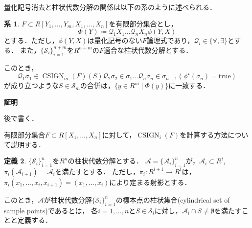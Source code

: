 \documentclass[uplatex, dvipdfmx]{jsarticle}
\makeatletter
\numberwithin{equation}{section}
\renewenvironment{proof}[1][\proofname]{\par
  \pushQED{\qed}%
  \normalfont \topsep6\p@\@plus6\p@\relax
  \trivlist
  \item\relax
  {\bfseries
  #1\@addpunct{.}}\hspace\labelsep\ignorespaces
}{
  \popQED\endtrivlist\@endpefalse
}
\newcommand{\Qua}{\mathcal{Q}}
\newcommand{\map}[3]{{#1}\colon{#2}\rightarrow{#3}}
\newcommand{\true}{\text{true}}
\DeclareMathOperator{\CSIGN}{CSIGN}
\theoremstyle{definition}
\newtheorem{definition}{定義}[section]
\newtheorem{corollary}[definition]{系}
\renewcommand{\proofname}{\textbf{証明}}
\makeatother
\begin{document}
量化記号消去と柱状代数分解の関係は以下の系のように述べられる．
\begin{corollary}
     $F \subset R[Y_1, \dots, Y_m, X_1, \dots, X_n]$を有限部分集合とし，
     \begin{equation}
          \Phi(Y)\coloneqq \Qua_1 X_1 \dots \Qua_n X_n \phi(Y,X)
     \end{equation}
     とする．ただし，$\phi(Y,X)$は量化記号のない$F$論理式であり，$\Qua_i \in \{\forall, \exists\}$とする．
     また，$\{\mathcal{S}_i\}_{i=1}^{n+m}$を$R^{n+m}$の$F$適合な柱状代数分解とする．

     このとき，
     \begin{equation}
          \Qua_1 \sigma_1 \in \CSIGN_m(F)(S) \Qua_2 \sigma_2 \in \sigma_1 \dots \Qua_n \sigma_n \in \sigma_{n-1}(\phi^\star(\sigma_n) = \true)
     \end{equation}
     が成り立つような$S \in \mathcal{S}_m$の合併は，$\{y \in R^m \mid \Phi(y)\}$に一致する．
\end{corollary}

\begin{proof}
     後で書く．
\end{proof}


有限部分集合$F \subset R[X_1, \dots, X_n]$に対して，$\CSIGN_i(F)$を計算する方法について説明する．

\begin{definition}
     $\{\mathcal{S}_i\}_{i=1}^n$を$R^n$の柱状代数分解とする．
     $\mathcal{A}=\{\mathcal{A}_{i}\}_{i=1}^n$が，$\mathcal{A}_i \subset R^i$, $\pi_i(\mathcal{A}_{i+1}) = \mathcal{A}_i$を満たすとする．
     ただし，$\map{\pi_i}{R^{i+1}}{R^i}$は，$\pi_i(x_1, \dots, x_i, x_{i+1}) = (x_1, \dots, x_i)$により定まる射影とする．
     
     このとき，$\mathcal{A}$が柱状代数分解$\{\mathcal{S}_i\}_{i=1}^n$の標本点の柱状集合(cylindrical set of sample points)であるとは，
     各$i=1, \dots, n$と$S\in \mathcal{S}_i$に対し，$\mathcal{A}_i\cap S \neq \emptyset$を満たすことと定義する．
\end{definition}
\end{document}
